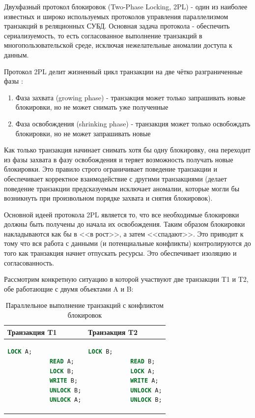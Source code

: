 Двухфазный протокол блокировок (Two-Phase Locking, 2PL) - один из наиболее известных и широко используемых протоколов управления параллелизмом транзакций в реляционных СУБД. Основная задача протокола - обеспечить сериализуемость, то есть согласованное выполнение транзакций в многопользовательской среде, исключая нежелательные аномалии доступа к данным.

Протокол 2PL делит жизненный цикл транзакции на две чётко разграниченные фазы \autocite[ch.18 §1.3]{Silberschatz}:

\begin{enumerate}
    \item Фаза захвата (growing phase) - транзакция может только запрашивать новые блокировки, но не может снимать уже полученные
    \item Фаза освобождения (shrinking phase) - транзакция может только освобождать блокировки, но не может запрашивать новые
\end{enumerate}

Как только транзакция начинает снимать хотя бы одну блокировку, она переходит из фазы захвата в фазу освобождения и теряет возможность получать новые блокировки. Это правило строго ограничивает поведение транзакции и обеспечивает корректное взаимодействие с другими транзакциями (делает поведение транзакции предсказуемым \textrightarrow исключает аномалии, которые могли бы возникнуть при произвольном порядке захвата и снятия блокировок). \autocites[ch.18 §1.3]{Silberschatz}[ch.22 §1.2]{ElmasriNavathe}

Основной идеей протокола 2PL является то, что все необходимые блокировки должны быть получены до начала их освобождения. Таким образом блокировки накладываются как бы в <<в рост>>, а затем <<спадают>>. Это приводит к тому что вся работа с данными (и потенциальные конфликты) контролируются до того как транзакция начнет отпускать ресурсы. Это обеспечивает изоляцию и согласованность. \autocite[ch.18 §1.3]{Silberschatz}

Рассмотрим конкретную ситуацию в которой участвуют две транзакции T1 и T2, обе работающие с двумя объектами A и B:
\begin{table}[H]
    \centering
    \begin{tabular}{|p{7cm}|p{7cm}|}
        \hline
        \textbf{Транзакция T1} & \textbf{Транзакция T2} \\
        \hline
        \begin{lstlisting}[language=SQL]
            LOCK A;
            READ A;
            LOCK B;
            WRITE B;
            UNLOCK B;
            UNLOCK A;
        \end{lstlisting}
        &
        \begin{lstlisting}[language=SQL]
            LOCK B;
            READ B;
            LOCK A;
            WRITE A;
            UNLOCK A;
            UNLOCK B;
        \end{lstlisting} \\
        \hline
    \end{tabular}
    \caption{Параллельное выполнение транзакций с конфликтом блокировок}
    \label{tab:conflict_transactions}
\end{table}
    

